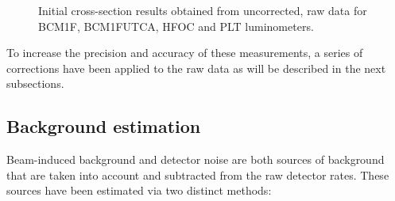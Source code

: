 \begin{figure}[!htb]
	\centering
	\caption[Initial cross-section for other online luminometers]{Initial cross-section results obtained from uncorrected, raw data for BCM1F, BCM1FUTCA, HFOC and PLT luminometers.}
	\label{fig:noCorr_luminometer_xsec}
\end{figure}

To increase the precision and accuracy of these measurements, a series of corrections have been applied to the raw data as will be described in the next subsections.

\subsection{Background estimation}

Beam-induced background and detector noise are both sources of background that are taken into account and subtracted from the raw detector rates. These sources have been estimated via two distinct methods:

